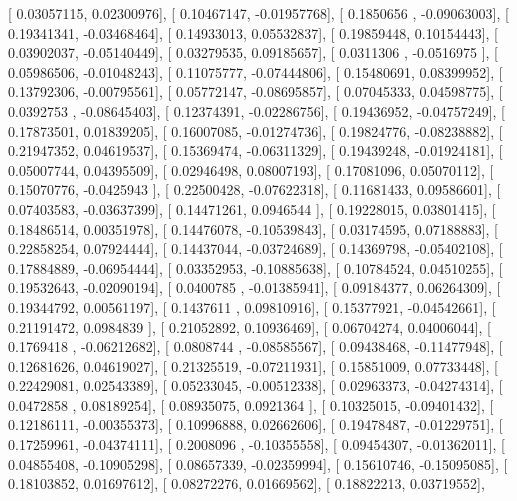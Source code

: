 \documentclass{article}
\begin{document}
       [ 0.03057115,  0.02300976],
       [ 0.10467147, -0.01957768],
       [ 0.1850656 , -0.09063003],
       [ 0.19341341, -0.03468464],
       [ 0.14933013,  0.05532837],
       [ 0.19859448,  0.10154443],
       [ 0.03902037, -0.05140449],
       [ 0.03279535,  0.09185657],
       [ 0.0311306 , -0.0516975 ],
       [ 0.05986506, -0.01048243],
       [ 0.11075777, -0.07444806],
       [ 0.15480691,  0.08399952],
       [ 0.13792306, -0.00795561],
       [ 0.05772147, -0.08695857],
       [ 0.07045333,  0.04598775],
       [ 0.0392753 , -0.08645403],
       [ 0.12374391, -0.02286756],
       [ 0.19436952, -0.04757249],
       [ 0.17873501,  0.01839205],
       [ 0.16007085, -0.01274736],
       [ 0.19824776, -0.08238882],
       [ 0.21947352,  0.04619537],
       [ 0.15369474, -0.06311329],
       [ 0.19439248, -0.01924181],
       [ 0.05007744,  0.04395509],
       [ 0.02946498,  0.08007193],
       [ 0.17081096,  0.05070112],
       [ 0.15070776, -0.0425943 ],
       [ 0.22500428, -0.07622318],
       [ 0.11681433,  0.09586601],
       [ 0.07403583, -0.03637399],
       [ 0.14471261,  0.0946544 ],
       [ 0.19228015,  0.03801415],
       [ 0.18486514,  0.00351978],
       [ 0.14476078, -0.10539843],
       [ 0.03174595,  0.07188883],
       [ 0.22858254,  0.07924444],
       [ 0.14437044, -0.03724689],
       [ 0.14369798, -0.05402108],
       [ 0.17884889, -0.06954444],
       [ 0.03352953, -0.10885638],
       [ 0.10784524,  0.04510255],
       [ 0.19532643, -0.02090194],
       [ 0.0400785 , -0.01385941],
       [ 0.09184377,  0.06264309],
       [ 0.19344792,  0.00561197],
       [ 0.1437611 ,  0.09810916],
       [ 0.15377921, -0.04542661],
       [ 0.21191472,  0.0984839 ],
       [ 0.21052892,  0.10936469],
       [ 0.06704274,  0.04006044],
       [ 0.1769418 , -0.06212682],
       [ 0.0808744 , -0.08585567],
       [ 0.09438468, -0.11477948],
       [ 0.12681626,  0.04619027],
       [ 0.21325519, -0.07211931],
       [ 0.15851009,  0.07733448],
       [ 0.22429081,  0.02543389],
       [ 0.05233045, -0.00512338],
       [ 0.02963373, -0.04274314],
       [ 0.0472858 ,  0.08189254],
       [ 0.08935075,  0.0921364 ],
       [ 0.10325015, -0.09401432],
       [ 0.12186111, -0.00355373],
       [ 0.10996888,  0.02662606],
       [ 0.19478487, -0.01229751],
       [ 0.17259961, -0.04374111],
       [ 0.2008096 , -0.10355558],
       [ 0.09454307, -0.01362011],
       [ 0.04855408, -0.10905298],
       [ 0.08657339, -0.02359994],
       [ 0.15610746, -0.15095085],
       [ 0.18103852,  0.01697612],
       [ 0.08272276,  0.01669562],
       [ 0.18822213,  0.03719552],
\end{document}

